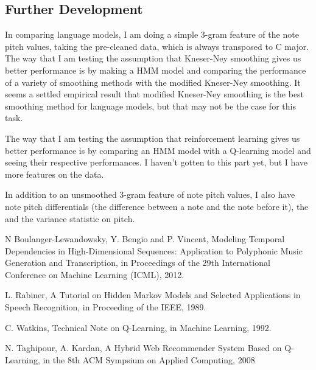 \documentclass{article}
\begin{document}
\subsection*{Further Development}
In comparing language models, I am doing a simple 3-gram feature of the note pitch values, taking the pre-cleaned data, which is always transposed to C major. The way that I am testing the assumption that Kneser-Ney smoothing gives us better performance is by making a HMM model and comparing the performance of a variety of smoothing methods with the modified Kneser-Ney smoothing. It seems a settled empirical result that modified Kneser-Ney smoothing is the best smoothing method for language models, but that may not be the case for this task.

The way that I am testing the assumption that reinforcement learning gives us better performance is by comparing an HMM model with a Q-learning model and seeing their respective performances. I haven't gotten to this part yet, but I have more features on the data. 

In addition to an unsmoothed 3-gram feature of note pitch values, I also have note pitch differentials (the difference between a note and the note before it), the and the variance statistic on pitch.

\begin{thebibliography}{9}%

N Boulanger-Lewandowsky, Y. Bengio and P. Vincent, Modeling Temporal Dependencies in High-Dimensional Sequences: Application to Polyphonic Music Generation and Transcription, in Proceedings of the 29th International Conference on Machine Learning (ICML), 2012.

L. Rabiner, A Tutorial on Hidden Markov Models and Selected Applications in Speech Recognition, in Proceeding of the IEEE, 1989.

C. Watkins, Technical Note on Q-Learning, in Machine Learning, 1992.

N. Taghipour, A. Kardan, A Hybrid Web Recommender System Based on Q-Learning, in the 8th ACM Sympsium on Applied Computing, 2008

\end{thebibliography}
\end{document}
